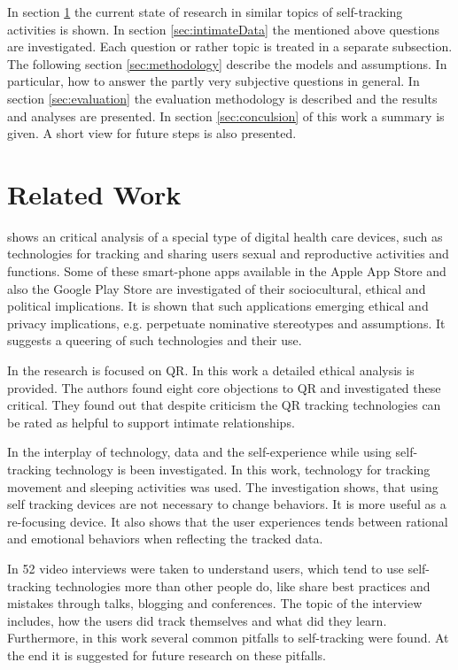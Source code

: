 \documentclass[journal]{vgtc}                %
\begin{document}

In section \ref{sec:relatedWork} the current state of research in similar topics of self-tracking activities is shown. In section \ref{sec:intimateData} the mentioned above questions are investigated. Each question or rather topic is treated in a separate subsection. The following section \ref{sec:methodology} describe the models and assumptions. In particular, how to answer the partly very subjective questions in general.
In section \ref{sec:evaluation} the evaluation methodology is described and the results and analyses are presented. In section \ref{sec:conculsion} of this work a summary is given. A short view for future steps is also presented.

\section{Related Work}
\label{sec:relatedWork}
\cite{doi:10.1080/13691058.2014.920528} shows an critical analysis of a special type of digital health care devices, such as technologies for tracking and sharing users sexual and reproductive activities and functions. Some of these smart-phone apps available in the Apple App Store and also the Google Play Store are investigated of their sociocultural, ethical and political implications. It is shown that such applications emerging ethical and privacy implications, e.g. perpetuate nominative stereotypes and assumptions. It suggests a queering of such technologies and their use.

In \cite{doi:10.1080/15265161.2017.1409823} the research is focused on \ac{QR}. In this work a detailed ethical analysis is provided. The authors found eight core objections to \acs{QR} and investigated these critical. They found out that despite criticism the \acs{QR} tracking technologies can be rated as helpful to support intimate relationships.

In \cite{sjoklint2015complexities} the interplay of technology, data and the self-experience while using self-tracking technology is been investigated. In this work, technology for tracking movement and sleeping activities was used. The investigation shows, that using self tracking devices are not necessary to change behaviors. It is more useful as a re-focusing device. It also shows that the user experiences tends between rational and emotional behaviors when reflecting the tracked data.

In \cite{choe2014understanding} 52 video interviews were taken to understand users, which tend to use self-tracking technologies more than other people do, like share best practices and mistakes through talks, blogging and conferences. The topic of the interview includes, how the users did track themselves and what did they learn. Furthermore, in this work several common pitfalls to self-tracking were found. At the end it is suggested for future research on these pitfalls.
\end{document}
